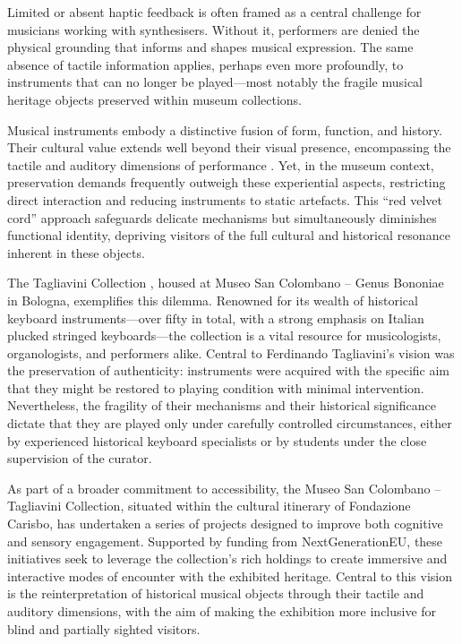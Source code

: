 Limited or absent haptic feedback is often framed as a central challenge for
musicians working with synthesisers. Without it, performers are denied the
physical grounding that informs and shapes musical expression. The same absence
of tactile information applies, perhaps even more profoundly, to instruments
that can no longer be played—most notably the fragile musical heritage objects
preserved within museum collections.  

Musical instruments embody a distinctive fusion of form, function, and history.
Their cultural value extends well beyond their visual presence, encompassing
the tactile and auditory dimensions of performance \cite{fritz_listener_2017}.
Yet, in the museum context, preservation demands frequently outweigh these
experiential aspects, restricting direct interaction and reducing instruments
to static artefacts. This ``red velvet cord'' approach
\cite{mcalpine_sampling_2014} safeguards delicate mechanisms but simultaneously
diminishes functional identity, depriving visitors of the full cultural and
historical resonance inherent in these objects.  

The Tagliavini Collection \cite{meer_collezione_2007}, housed at Museo San
Colombano -- Genus Bononiae in Bologna, exemplifies this dilemma. Renowned for
its wealth of historical keyboard instruments—over fifty in total, with a
strong emphasis on Italian plucked stringed keyboards—the collection is a vital
resource for musicologists, organologists, and performers alike. Central to
Ferdinando Tagliavini’s vision was the preservation of authenticity: instruments
were acquired with the specific aim that they might be restored to playing
condition with minimal intervention. Nevertheless, the fragility of their
mechanisms and their historical significance dictate that they are played only
under carefully controlled circumstances, either by experienced historical
keyboard specialists or by students under the close supervision of the curator.  

As part of a broader commitment to accessibility, the Museo San Colombano --
Tagliavini Collection, situated within the cultural itinerary of Fondazione
Carisbo, has undertaken a series of projects designed to improve both cognitive
and sensory engagement. Supported by funding from NextGenerationEU, these
initiatives seek to leverage the collection’s rich holdings to create immersive
and interactive modes of encounter with the exhibited heritage. Central to this
vision is the reinterpretation of historical musical objects through their
tactile and auditory dimensions, with the aim of making the exhibition more
inclusive for blind and partially sighted visitors.  


